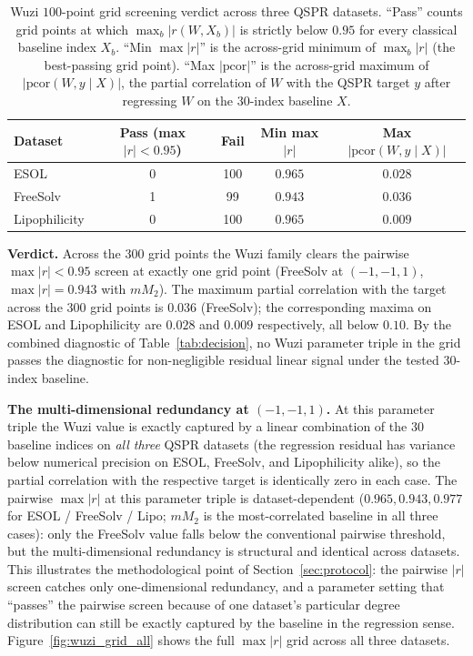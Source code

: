 \documentclass[STIX1COL]{WileyNJDv5}
\theoremstyle{definition}
\begin{document}
\begin{table}[h]
\centering
\small
\caption{Wuzi $100$-point grid screening verdict across three QSPR datasets. ``Pass'' counts grid points at which $\max_{b}\lvert r(W, X_b)\rvert$ is strictly below $0.95$ for every classical baseline index $X_b$. ``Min $\max\lvert r\rvert$'' is the across-grid minimum of $\max_b\lvert r\rvert$ (the best-passing grid point). ``Max $\lvert\mathrm{pcor}\rvert$'' is the across-grid maximum of $\lvert\mathrm{pcor}(W, y \mid X)\rvert$, the partial correlation of $W$ with the QSPR target $y$ after regressing $W$ on the $30$-index baseline $X$.}
\label{tab:wuzi_verdict_paper1}
\begin{tabular}{lcccc}
\toprule
Dataset & Pass (max $\lvert r\rvert < 0.95$) & Fail & Min max $\lvert r\rvert$ & Max $\lvert\mathrm{pcor}(W, y \mid X)\rvert$\\
\midrule
ESOL          & 0 & 100 & $0.965$ & $0.028$\\
FreeSolv      & 1 &  99 & $0.943$ & $0.036$\\
Lipophilicity & 0 & 100 & $0.965$ & $0.009$\\
\bottomrule
\end{tabular}
\end{table}

\textbf{Verdict.} Across the $300$ grid points the Wuzi family
clears the pairwise $\max|r| < 0.95$ screen at exactly one grid
point (FreeSolv at $(-1, -1, 1)$, $\max|r| = 0.943$ with $mM_2$).
The maximum partial correlation with the target across the $300$
grid points is $0.036$ (FreeSolv); the corresponding maxima on
ESOL and Lipophilicity are $0.028$ and $0.009$ respectively, all
below $0.10$. By the combined diagnostic of
Table~\ref{tab:decision}, no Wuzi parameter triple in the grid
passes the diagnostic for non-negligible residual linear signal
under the tested $30$-index baseline.

\textbf{The multi-dimensional redundancy at $(-1, -1, 1)$.}
At this parameter triple the Wuzi value is exactly captured by a
linear combination of the $30$ baseline indices on \emph{all three}
QSPR datasets (the regression residual has variance below numerical
precision on ESOL, FreeSolv, and Lipophilicity alike), so the
partial correlation with the respective target is identically zero
in each case. The pairwise $\max|r|$ at this parameter triple is
dataset-dependent ($0.965, 0.943, 0.977$ for ESOL / FreeSolv / Lipo;
$mM_2$ is the most-correlated baseline in all three cases): only
the FreeSolv value falls below the conventional pairwise threshold,
but the multi-dimensional redundancy is structural and identical
across datasets. This illustrates the methodological point of
Section~\ref{sec:protocol}: the pairwise $|r|$ screen catches only
one-dimensional redundancy, and a parameter setting that ``passes''
the pairwise screen because of one dataset's particular degree
distribution can still be exactly captured by the baseline in the
regression sense. Figure~\ref{fig:wuzi_grid_all} shows the full
$\max|r|$ grid across all three datasets.
\end{document}

